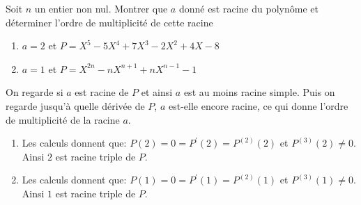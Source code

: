 \documentclass[a4paper, 11pt,reqno]{article}
\begin{document}
\begin{exercice}  \;
	Soit $n$ un entier non nul. Montrer que $a$ donn\'e est racine du polyn\^ome et d\'eterminer l'ordre de multiplicit\'e de cette racine
	\begin{enumerate}
		\item $a=2$ et $P=X^5-5X^4+7X^3-2X^2+4X-8$
		\item $a=1$ et $P=X^{2n}-nX^{n+1}+nX^{n-1}-1  $
	\end{enumerate}
\end{exercice}
\begin{correction}  \;
	On regarde si $a$ est racine de $P$ et ainsi $a$ est au moins racine simple. Puis on regarde jusqu'\`{a} quelle d\'eriv\'ee de $P$, $a$ est-elle encore racine, ce qui donne l'ordre de multiplicit\'e de la racine $a$.
	\begin{enumerate}
		\item Les calculs donnent que: $P(2)=0=P^{\prime}(2)=P^{(2)}(2)$ et $P^{(3)}(2)\not= 0$. Ainsi $2$ est racine triple de $P$.
		\item Les calculs donnent que: $P(1)=0=P^{\prime}(1)=P^{(2)}(1)$ et $P^{(3)}(1)\not= 0$. Ainsi $1$ est racine triple de $P$.
	\end{enumerate}
\end{correction}
\end{document}
